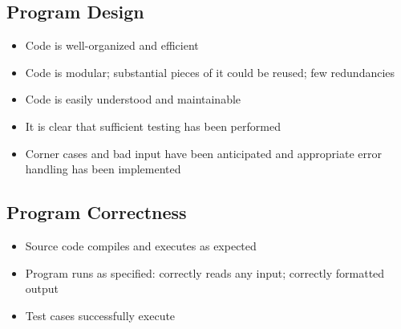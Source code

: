 \documentclass[12pt]{scrartcl}
\begin{document}
\subsection*{Program Design}
\begin{itemize}
  \item Code is well-organized and efficient
  \item Code is modular; substantial pieces of it could be reused; few redundancies
  \item Code is easily understood and maintainable
  \item It is clear that sufficient testing has been performed
  \item Corner cases and bad input have been anticipated and appropriate error handling has been implemented  
\end{itemize}

\subsection*{Program Correctness}
\begin{itemize}
  \item Source code compiles and executes as expected
  \item Program runs as specified: correctly reads any input; correctly formatted output
  \item Test cases successfully execute
\end{itemize}
\end{document}
